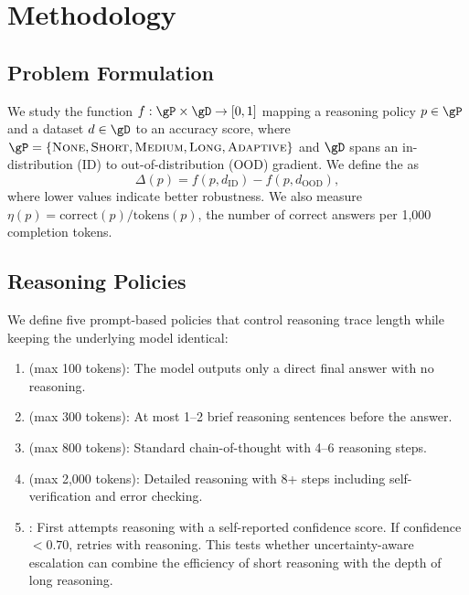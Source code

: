 \section{Methodology}
\label{sec:method}

\subsection{Problem Formulation}
\label{sec:formulation}

We study the function $f: \gP \times \gD \rightarrow [0,1]$ mapping a reasoning policy $p \in \gP$ and a dataset $d \in \gD$ to an accuracy score, where $\gP = \{\pnone, \pshort, \pmedium, \plong, \padaptive\}$ and $\gD$ spans an in-distribution (ID) to out-of-distribution (OOD) gradient. We define the  as
\begin{equation}
\Delta(p) = f(p, d_{\text{ID}}) - f(p, d_{\text{OOD}}),
\end{equation}
where lower values indicate better robustness. We also measure  $\eta(p) = \text{correct}(p) / \text{tokens}(p)$, the number of correct answers per 1,000 completion tokens.

\subsection{Reasoning Policies}
\label{sec:policies}

We define five prompt-based policies that control reasoning trace length while keeping the underlying model identical:

\begin{enumerate}[leftmargin=*,itemsep=2pt,topsep=2pt]
    \item \textbf{\pnone} (max 100 tokens): The model outputs only a direct final answer with no reasoning.
    \item \textbf{\pshort} (max 300 tokens): At most 1--2 brief reasoning sentences before the answer.
    \item \textbf{\pmedium} (max 800 tokens): Standard chain-of-thought with 4--6 reasoning steps.
    \item \textbf{\plong} (max 2,000 tokens): Detailed reasoning with 8+ steps including self-verification and error checking.
    \item \textbf{\padaptive}: First attempts \pshort reasoning with a self-reported confidence score. If confidence $< 0.70$, retries with \plong reasoning. This tests whether uncertainty-aware escalation can combine the efficiency of short reasoning with the depth of long reasoning.
\end{enumerate}

